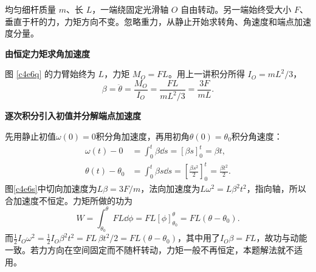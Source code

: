 \begin{question}
\begin{example}[恒定切向力驱动的细杆]
均匀细杆质量 $m$、长 $L$，一端绕固定光滑轴 $O$ 自由转动。另一端始终受大小 $F$、垂直于杆的力，力矩方向不变。忽略重力，从静止开始求转角、角速度和端点加速度分量。
\end{example}
\end{question}
\begin{solution}\textbf{由恒定力矩求角加速度}\par\nobreak
图 \ref{c4e6q} 的力臂始终为 $L$，力矩 $M_O=FL$。用上一讲积分所得 $I_O=mL^2/3$，
\[
 \beta=\ddot\theta=\frac{M_O}{I_O}
 =\frac{FL}{mL^2/3}=\frac{3F}{mL}.
\]


\par\medskip{}\noindent\textbf{逐次积分引入初值并分解端点加速度}\par\nobreak
先用静止初值$\omega(0)=0$积分角加速度，再用初角$\theta(0)=\theta_0$积分角速度：
\begin{align*}
\omega(t)-0&=\int_0^t\beta\dd s=[\beta s]_0^t=\beta t,\\
\theta(t)-\theta_0&=\int_0^t\beta s\dd s
=\left[\frac{\beta s^2}{2}\right]_0^t
=\frac{\beta t^2}{2}.
\end{align*}
图\ref{c4e6s}中切向加速度为$L\beta=3F/m$，法向加速度为$L\omega^2=L\beta^2t^2$，指向轴，所以合加速度不恒定。力矩所做的功为
\[
W=\int_{\theta_0}^{\theta}FL\dd\phi
=FL[\phi]_{\theta_0}^{\theta}=FL(\theta-\theta_0).
\]
而$\tfrac12I_O\omega^2=\tfrac12I_O\beta^2t^2
=FL\,\beta t^2/2=FL(\theta-\theta_0)$，其中用了$I_O\beta=FL$，故功与动能一致。若力方向在空间固定而不随杆转动，力矩一般不再恒定，本题解法就不适用。
\end{solution}


